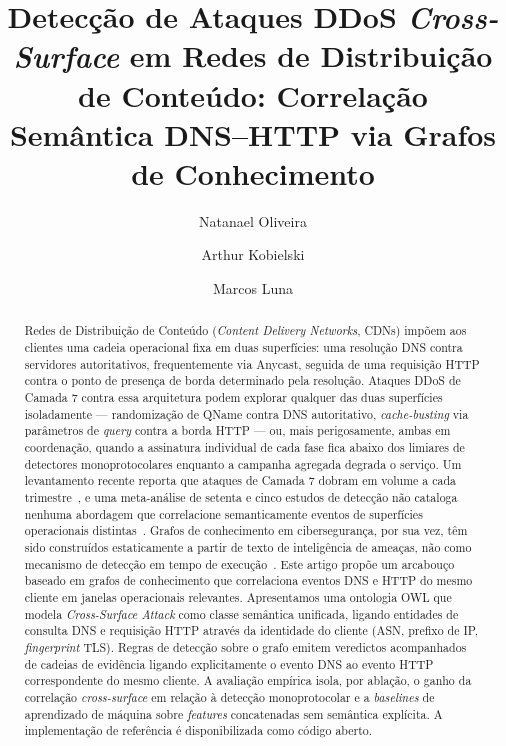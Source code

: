 \documentclass[preprint,12pt]{elsarticle}
\begin{document}
\begin{frontmatter}

\title{Detecção de Ataques DDoS \emph{Cross-Surface} em Redes de Distribuição de Conteúdo: Correlação Semântica DNS--HTTP via Grafos de Conhecimento}

\author[inst1]{Natanael Oliveira}

\author[inst1]{Arthur Kobielski}

\author[inst1]{Marcos Luna}



\begin{abstract}
Redes de Distribuição de Conteúdo (\emph{Content Delivery Networks}, CDNs) impõem aos clientes uma cadeia operacional fixa em duas superfícies: uma resolução DNS contra servidores autoritativos, frequentemente via Anycast, seguida de uma requisição HTTP contra o ponto de presença de borda determinado pela resolução. Ataques DDoS de Camada 7 contra essa arquitetura podem explorar qualquer das duas superfícies isoladamente --- randomização de QName contra DNS autoritativo, \emph{cache-busting} via parâmetros de \emph{query} contra a borda HTTP --- ou, mais perigosamente, ambas em coordenação, quando a assinatura individual de cada fase fica abaixo dos limiares de detectores monoprotocolares enquanto a campanha agregada degrada o serviço. Um levantamento recente reporta que ataques de Camada 7 dobram em volume a cada trimestre~\cite{tripathi2021application}, e uma meta-análise de setenta e cinco estudos de detecção não cataloga nenhuma abordagem que correlacione semanticamente eventos de superfícies operacionais distintas~\cite{odusami2020survey}. Grafos de conhecimento em cibersegurança, por sua vez, têm sido construídos estaticamente a partir de texto de inteligência de ameaças, não como mecanismo de detecção em tempo de execução~\cite{jia2018practical,liu2022recent,bonagiri2024practical}. Este artigo propõe um arcabouço baseado em grafos de conhecimento que correlaciona eventos DNS e HTTP do mesmo cliente em janelas operacionais relevantes. Apresentamos uma ontologia OWL que modela \emph{Cross-Surface Attack} como classe semântica unificada, ligando entidades de consulta DNS e requisição HTTP através da identidade do cliente (ASN, prefixo de IP, \emph{fingerprint} TLS). Regras de detecção sobre o grafo emitem veredictos acompanhados de cadeias de evidência ligando explicitamente o evento DNS ao evento HTTP correspondente do mesmo cliente. A avaliação empírica isola, por ablação, o ganho da correlação \emph{cross-surface} em relação à detecção monoprotocolar e a \emph{baselines} de aprendizado de máquina sobre \emph{features} concatenadas sem semântica explícita. A implementação de referência é disponibilizada como código aberto.


\end{abstract}
\end{frontmatter}
\end{document}
